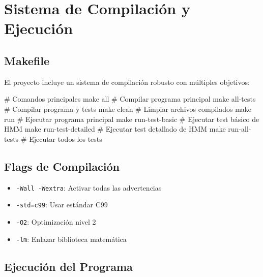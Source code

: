 \documentclass[
]{article}
\newenvironment{Shaded}{\begin{snugshade}}{\end{snugshade}}
\newcommand{\CommentTok}[1]{\textcolor[rgb]{0.37,0.37,0.37}{#1}}
\newcommand{\NormalTok}[1]{\textcolor[rgb]{0.00,0.23,0.31}{#1}}
\providecommand{\tightlist}{%
  \setlength{\itemsep}{0pt}\setlength{\parskip}{0pt}}
\begin{document}
\section{Sistema de Compilación y
Ejecución}\label{sistema-de-compilaciuxf3n-y-ejecuciuxf3n}

\subsection{Makefile}\label{makefile}

El proyecto incluye un sistema de compilación robusto con múltiples
objetivos:

\begin{Shaded}
\begin{Highlighting}[]
\CommentTok{\# Comandos principales}
\NormalTok{make all                  }\CommentTok{\# Compilar programa principal}
\NormalTok{make all{-}tests           }\CommentTok{\# Compilar programa y tests}
\NormalTok{make clean               }\CommentTok{\# Limpiar archivos compilados}
\NormalTok{make run                 }\CommentTok{\# Ejecutar programa principal}
\NormalTok{make run{-}test{-}basic      }\CommentTok{\# Ejecutar test básico de HMM}
\NormalTok{make run{-}test{-}detailed   }\CommentTok{\# Ejecutar test detallado de HMM}
\NormalTok{make run{-}all{-}tests       }\CommentTok{\# Ejecutar todos los tests}
\end{Highlighting}
\end{Shaded}

\subsection{Flags de Compilación}\label{flags-de-compilaciuxf3n}

\begin{itemize}
\tightlist
\item
  \texttt{-Wall\ -Wextra}: Activar todas las advertencias
\item
  \texttt{-std=c99}: Usar estándar C99
\item
  \texttt{-O2}: Optimización nivel 2
\item
  \texttt{-lm}: Enlazar biblioteca matemática
\end{itemize}

\subsection{Ejecución del Programa}\label{ejecuciuxf3n-del-programa}
\end{document}
